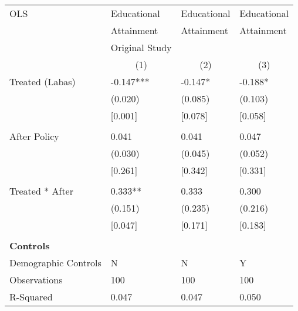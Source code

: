 \begin{tabular}{p{4cm}p{1.5cm}p{1.5cm}p{1.5cm}}
\hline\hline
OLS               &Educational & Educational &Educational \\
&Attainment &Attainment &Attainment \\
&Original Study & &  \\
&\multicolumn{1}{c}{(1)}&\multicolumn{1}{c}{(2)}&\multicolumn{1}{c}{(3)}\\
\hline
Treated (Labas)   &  -0.147***&   -0.147* & -0.188* \\
                &  (0.020)&  (0.085) & (0.103)\\
								& [0.001]	 &  [0.078]&  [0.058]\\
                \\
After Policy   &   0.041&   0.041 &0.047\\
                &  (0.030)&  (0.045) & (0.052)\\
								& [0.261]	 &  [0.342]&  [0.331]\\
                \\
Treated * After   &  0.333**&  0.333 & 0.300\\
                &  (0.151)&  (0.235) &(0.216)\\
									& [0.047]	 &  [0.171]&  [0.183]\\
                \\

\multicolumn{4}{l}{\textbf{Controls}}  \\                  
Demographic Controls       &   N     &        N&        Y\\

\hline
Observations    &    100&    100 & 100\\
R-Squared    &  0.047   & 0.047 & 0.050     \\
\hline\hline
\end{tabular}